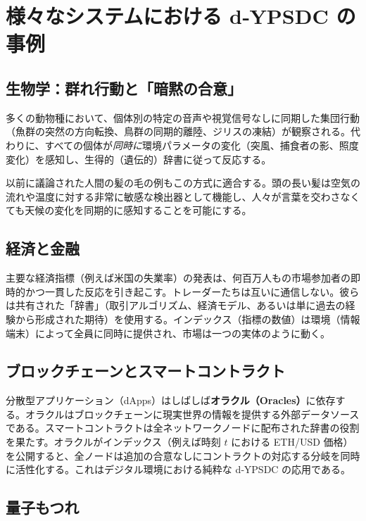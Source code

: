 \documentclass[11pt,a4paper]{article}
\begin{document}
	\section{様々なシステムにおける d‑YPSDC の事例}
	
	\subsection{生物学：群れ行動と「暗黙の合意」}
	
	多くの動物種において、個体別の特定の音声や視覚信号なしに同期した集団行動（魚群の突然の方向転換、鳥群の同期的離陸、ジリスの凍結）が観察される。代わりに、すべての個体が\emph{同時に}環境パラメータの変化（突風、捕食者の影、照度変化）を感知し、生得的（遺伝的）辞書に従って反応する。
	
	以前に議論された人間の髪の毛の例もこの方式に適合する。頭の長い髪は空気の流れや温度に対する非常に敏感な検出器として機能し、人々が言葉を交わさなくても天候の変化を同期的に感知することを可能にする。
	
	\subsection{経済と金融}
	
	主要な経済指標（例えば米国の失業率）の発表は、何百万人もの市場参加者の即時的かつ一貫した反応を引き起こす。トレーダーたちは互いに通信しない。彼らは共有された「辞書」（取引アルゴリズム、経済モデル、あるいは単に過去の経験から形成された期待）を使用する。インデックス（指標の数値）は環境（情報端末）によって全員に同時に提供され、市場は一つの実体のように動く。
	
	\subsection{ブロックチェーンとスマートコントラクト}
	
	分散型アプリケーション（dApps）はしばしば\textbf{オラクル（Oracles）}に依存する。オラクルはブロックチェーンに現実世界の情報を提供する外部データソースである。スマートコントラクトは全ネットワークノードに配布された辞書の役割を果たす。オラクルがインデックス（例えば時刻 \(t\) における ETH/USD 価格）を公開すると、全ノードは追加の合意なしにコントラクトの対応する分岐を同時に活性化する。これはデジタル環境における純粋な d‑YPSDC の応用である。
	
	\subsection{量子もつれ}
	
\end{document}
